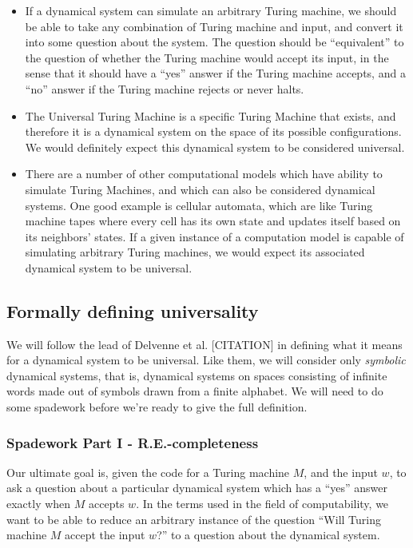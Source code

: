 \documentclass{fkpset}
\begin{document}
\begin{itemize}
	\item If a dynamical system can simulate an arbitrary Turing machine, we should be able to take any combination of Turing machine and input, and convert it into some question about the system. The question should be ``equivalent'' to the question of whether the Turing machine would accept its input, in the sense that it should have a ``yes'' answer if the Turing machine accepts, and a ``no'' answer if the Turing machine rejects or never halts.
	
	\item The Universal Turing Machine is a specific Turing Machine that exists, and therefore it is a dynamical system on the space of its possible configurations. We would definitely expect this dynamical system to be considered universal.
	
	\item There are a number of other computational models which have ability to simulate Turing Machines, and which can also be considered dynamical systems. One good example is cellular automata, which are like Turing machine tapes where every cell has its own state and updates itself based on its neighbors' states. If a given instance of a computation model is capable of simulating arbitrary Turing machines, we would expect its associated dynamical system to be universal.
	
\end{itemize}

\subsection*{Formally defining universality}

We will follow the lead of Delvenne et al. [CITATION] in defining what it means for a dynamical system to be universal. Like them, we will consider only {\it symbolic} dynamical systems, that is, dynamical systems on spaces consisting of infinite words made out of symbols drawn from a finite alphabet. We will need to do some spadework before we're ready to give the full definition.

\subsubsection*{Spadework Part I - R.E.-completeness}

Our ultimate goal is, given the code for a Turing machine $M$, and the input $w$, to ask a question about a particular dynamical system which has a ``yes'' answer exactly when $M$ accepts $w$. In the terms used in the field of computability, we want to be able to reduce an arbitrary instance of the question ``Will Turing machine $M$ accept the input $w$?'' to a question about the dynamical system.
\end{document}
